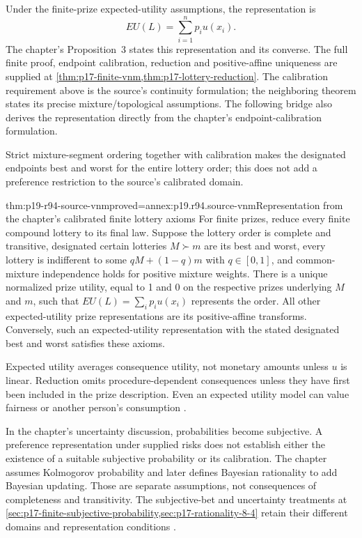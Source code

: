 Under the finite-prize expected-utility assumptions, the representation is
\[
                  EU(L)=\sum_{i=1}^n p_i u(x_i).
\]
The chapter's Proposition~3 states this representation and its converse.
The full finite proof, endpoint calibration, reduction and positive-affine
uniqueness are supplied at \cref{thm:p17-finite-vnm,thm:p17-lottery-reduction}.
The calibration requirement above is the source's continuity formulation;
the neighboring theorem states its precise mixture/topological assumptions.
The following bridge also derives the representation directly from the
chapter's endpoint-calibration formulation.

Strict mixture-segment ordering together with calibration makes the
designated endpoints best and worst for the entire lottery order; this
does not add a preference restriction to the source's calibrated domain.

\begin{hbtheorem}{thm:p19-r94-source-vnm}{proved=annex:p19.r94.source-vnm}{Representation from the chapter's calibrated finite lottery axioms}
For finite prizes, reduce every finite compound lottery to its final law.
Suppose the lottery order is complete and transitive, designated certain
lotteries \(M\succ m\) are its best and worst, every lottery is
indifferent to some \(qM+(1-q)m\) with \(q\in[0,1]\), and
common-mixture independence holds for positive mixture weights. There is
a unique normalized prize utility, equal to 1 and 0 on the respective
prizes underlying \(M\) and \(m\), such
that \(EU(L)=\sum_i p_i u(x_i)\) represents the order. All other
expected-utility prize representations are its positive-affine transforms.
Conversely, such an expected-utility representation with the stated
designated best and worst satisfies these axioms.
\end{hbtheorem}

Expected utility averages consequence utility, not monetary amounts unless
\(u\) is linear. Reduction omits procedure-dependent consequences unless
they have first been included in the prize description. Even an expected
utility model can value fairness or another person's consumption
\cite[pp.~566--568]{DhamiAlNowaihi2021Economics}.

In the chapter's uncertainty discussion, probabilities become subjective.
A preference representation under supplied risks does not establish either
the existence of a suitable subjective probability or its calibration.
The chapter assumes Kolmogorov probability and later defines Bayesian
rationality to add Bayesian updating. Those are separate assumptions,
not consequences of completeness and transitivity. The subjective-bet
and uncertainty treatments at
\cref{sec:p17-finite-subjective-probability,sec:p17-rationality-8-4}
retain their different domains and representation conditions
\cite[p.~567, note~4]{DhamiAlNowaihi2021Economics}.


